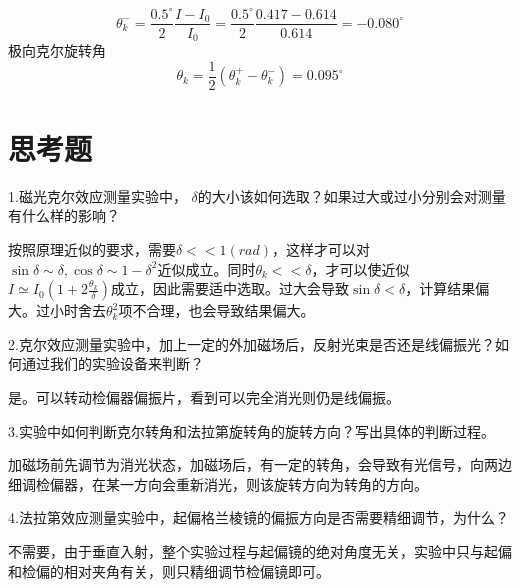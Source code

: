 \documentclass{article}
\begin{document}
\begin{equation}
	\theta_k^-=\frac{0.5^{\circ}}{2}\frac{I-I_0}{I_0}=\frac{0.5^{\circ}}{2}\frac{0.417-0.614}{0.614}=-0.080^{\circ}
\end{equation}
极向克尔旋转角
\begin{equation}
	\theta_k=\frac{1}{2}(\theta_k^+-\theta_k^-)=0.095^{\circ}
\end{equation}

\section{思考题}
1.磁光克尔效应测量实验中， $ \delta $的大小该如何选取？如果过大或过小分别会对测量有什么样的影响？


按照原理近似的要求，需要$ \delta<<1(rad) $，这样才可以对$ \sin\delta\sim\delta,\cos\delta\sim1-\delta^2 $近似成立。同时$ \theta_k<<\delta $，才可以使近似$ I\simeq I_0(1+2\frac{\theta_k}{\delta}) $成立，因此需要适中选取。过大会导致$ \sin\delta<\delta $，计算结果偏大。过小时舍去$ \theta_k^2 $项不合理，也会导致结果偏大。


2.克尔效应测量实验中，加上一定的外加磁场后，反射光束是否还是线偏振光？如何通过我们的实验设备来判断？


是。可以转动检偏器偏振片，看到可以完全消光则仍是线偏振。


3.实验中如何判断克尔转角和法拉第旋转角的旋转方向？写出具体的判断过程。


加磁场前先调节为消光状态，加磁场后，有一定的转角，会导致有光信号，向两边细调检偏器，在某一方向会重新消光，则该旋转方向为转角的方向。


4.法拉第效应测量实验中，起偏格兰棱镜的偏振方向是否需要精细调节，为什么？


不需要，由于垂直入射，整个实验过程与起偏镜的绝对角度无关，实验中只与起偏和检偏的相对夹角有关，则只精细调节检偏镜即可。
\end{document}
